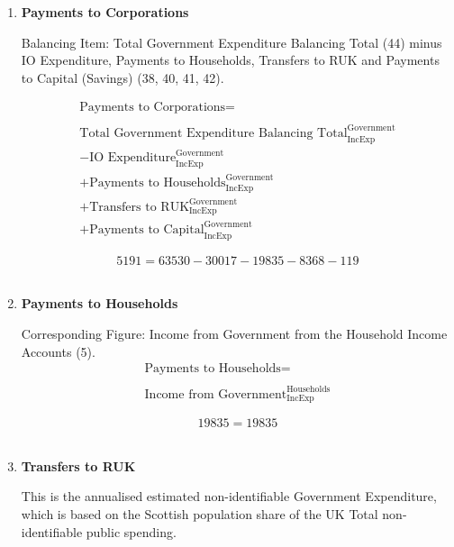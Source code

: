 \begin{enumerate}
\item \textbf {Payments to  Corporations}

Balancing Item:  Total Government Expenditure Balancing Total (44) minus IO Expenditure, Payments to Households, Transfers to RUK and Payments to Capital (Savings) (38, 40, 41, 42).

\begin{equation}
\begin{split}
\text{Payments to Corporations} =  \\ \\
\text{Total Government Expenditure Balancing Total}^\text{Government}_\text{IncExp}\\
-\text{IO Expenditure}^\text{Government}_\text{IncExp}\\
+\text{Payments to Households}^\text{Government}_\text{IncExp}\\
+\text{Transfers to RUK}^\text{Government}_\text{IncExp}\\
+\text{Payments to Capital}^\text{Government}_\text{IncExp}
\end{split} \label{eq:2.5.43}
\end{equation}

\begin{equation} \nonumber
5191 = 63530-30017-19835-8368-119
\end{equation}\\


\item \textbf {Payments to Households}

Corresponding Figure: Income from Government from the Household Income Accounts (5).\\

\begin{equation}
\begin{split}
\text{Payments to Households} =  \\ \\
\text{Income from Government}^\text{Households}_\text{IncExp}
\end{split} \label{eq:2.5.44}
\end{equation}

\begin{equation} \nonumber
19835 = 19835
\end{equation}\\


\item \textbf {Transfers to RUK}

This is the annualised estimated non-identifiable Government Expenditure, which is based on the Scottish population share of the UK Total non-identifiable public spending. \cite{ScotGov2013b}


\end{enumerate}
